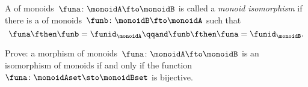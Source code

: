 \begin{ctdefinition}
    \label{def:monoid-iso}
    A \whomo of monoids~$\funa\colon \monoidA \fto \monoidB$ is called a \emph{monoid isomorphism} if there is a \whomo of monoids~$\funb\colon \monoidB \fto \monoidA$ such that
    \begin{equation}
        \funa \fthen \funb = \funid_\monoidA \qqand \funb \fthen \funa = \funid_\monoidB.
    \end{equation}
\end{ctdefinition}


\begin{gradedexercise}
    Prove: a morphism of monoids~$\funa\colon \monoidA \fto \monoidB$ is an isomorphism of monoids if and only if the function~$\funa\colon \monoidAset \sto \monoidBset$ is bijective.
\end{gradedexercise}



